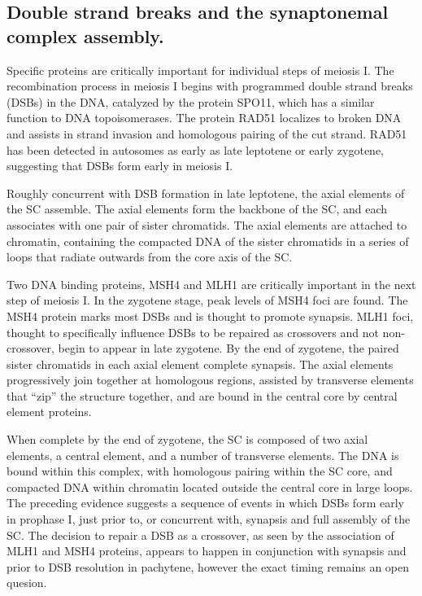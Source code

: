 \subsection{Double strand breaks and the synaptonemal complex assembly.}

Specific proteins are critically important for individual steps of meiosis I.
The recombination process in meiosis I begins with programmed double strand breaks (DSBs) in the DNA, catalyzed by the protein SPO11, which has a similar function to DNA topoisomerases\cite{DeMassy2013}.
The protein RAD51 localizes to broken DNA and assists in strand invasion and homologous pairing of the cut strand.
RAD51 has been detected in autosomes as early as late leptotene or early zygotene\cite{Oliver-Bonet2005}, suggesting that DSBs form early in meiosis I.

Roughly concurrent with DSB formation in late leptotene, the axial elements of the SC assemble\cite{Yang2009}.
The axial elements form the backbone of the SC, and each associates with one pair of sister chromatids.
The axial elements are attached to chromatin, containing the compacted DNA of the sister chromatids in a series of loops that radiate outwards from the core axis of the SC.

Two DNA binding proteins, MSH4 and MLH1 are critically important in the next step of meiosis I.
In the zygotene stage, peak levels of MSH4 foci are found.
The MSH4 protein marks most DSBs and is thought to promote synapsis\cite{Oliver-Bonet2005}.
MLH1 foci, thought to specifically influence DSBs to be repaired as crossovers and not non-crossover\cite{Baker1996}, begin to appear in late zygotene\cite{Oliver-Bonet2005}.
By the end of zygotene, the paired sister chromatids in each axial element complete synapsis.
The axial elements progressively join together at homologous regions, assisted by transverse elements that ``zip'' the structure together, and are bound in the central core by central element proteins\cite{Yang2009}.

When complete by the end of zygotene, the SC is composed of two axial elements, a central element, and a number of transverse elements\cite{Yang2009}.
The DNA is bound within this complex, with homologous pairing within the SC core, and compacted DNA within chromatin located outside the central core in large loops.
The preceding evidence suggests a sequence of events in which DSBs form early in prophase I, just prior to, or concurrent with, synapsis and full assembly of the SC.
The decision to repair a DSB as a crossover, as seen by the association of MLH1 and MSH4 proteins, appears to happen in conjunction with synapsis and prior to DSB resolution in pachytene, however the exact timing remains an open quesion\cite{Baudat2007}.

